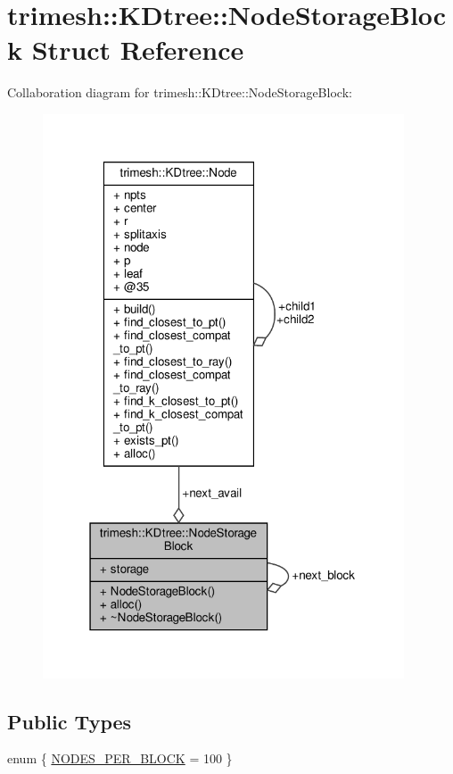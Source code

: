 \hypertarget{structtrimesh_1_1KDtree_1_1NodeStorageBlock}{}\section{trimesh\+:\+:K\+Dtree\+:\+:Node\+Storage\+Block Struct Reference}
\label{structtrimesh_1_1KDtree_1_1NodeStorageBlock}


Collaboration diagram for trimesh\+:\+:K\+Dtree\+:\+:Node\+Storage\+Block\+:\nopagebreak
\begin{figure}[H]
\begin{center}
\leavevmode
\includegraphics[width=304pt]{d4/df2/structtrimesh_1_1KDtree_1_1NodeStorageBlock__coll__graph}
\end{center}
\end{figure}
\subsection*{Public Types}
\begin{DoxyCompactItemize}
\item 
enum \{ \hyperlink{structtrimesh_1_1KDtree_1_1NodeStorageBlock_a53a3d1f98196691515bfb4c974102336abed02221dc8cfae72d1a32f807c5316f}{N\+O\+D\+E\+S\+\_\+\+P\+E\+R\+\_\+\+B\+L\+O\+CK} = 100
 \}
\end{DoxyCompactItemize}
